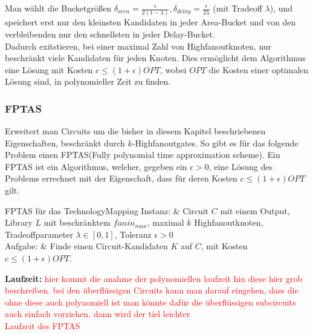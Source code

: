 \documentclass[11pt, a4paper, german]{article}
\newcommand{\TM}{TechnologyMapping}
\begin{document}
Man wählt die Bucketgrößen $\delta_{area} = \frac{\epsilon}{2(1-\lambda)}, \delta_{delay} = \frac{\epsilon}{2\lambda}$ (mit Tradeoff $\lambda$), und speichert erst nur den kleinsten Kandidaten in jeder Area-Bucket und von den verbleibenden nur den schnellsten in jeder Delay-Bucket.\\
Dadurch exitstieren, bei einer maximal Zahl von Highfanoutknoten, nur beschränkt viele Kandidaten für jeden Knoten. Dies ermöglicht dem  Algorithmus eine Lösung mit Kosten $c\leq (1+\epsilon)OPT$, wobei $OPT$ die Kosten einer optimalen Lösung sind, in polynomieller Zeit zu finden.

\subsubsection{FPTAS}
\label{subsubsec:fptas}
Erweitert man Circuits um die bisher in diesem Kapitel beschriebenen Eigenschaften, beschränkt durch $k$-Highfanoutgates. So gibt es für das folgende Problem einen FPTAS(Fully polynomial time approximation scheme). Ein FPTAS ist ein Algorithmus, welcher, gegeben ein $\epsilon > 0$, eine Lösung des Problems errechnet mit der Eigenschaft, dass für deren Kosten $c \leq (1+\epsilon)OPT$ gilt. \\
 \begin{problem}[framed]{FPTAS für das \TM}
  Instanz:  & Circuit $C$ mit einem Output, Library $L$ mit beschr\"anktem $fanin_{max}$, maximal $k$ Highfanoutknoten, Tradeoffparameter $\lambda \in [0,1]$, Toleranz $\epsilon > 0$ \\
  Aufgabe: &  Finde einen Circuit-Kandidaten $K$ auf $C$, mit Kosten $c \leq (1+\epsilon)OPT$.
\end{problem}
{\bf Laufzeit: }
\textcolor{red}{hier kommt die anahme der polynomiellen laufzeit hin diese hier grob beschreiben. bei den überflüssigen Circuits kann man darauf eingehen, dass die ohne diese auch polynomiell ist man könnte dafür die überflüssigen subcircuits auch einfach vorziehen. dann wird der tiel leichter}\\
\textcolor{red}{Laufzeit des FPTAS}
\end{document}
